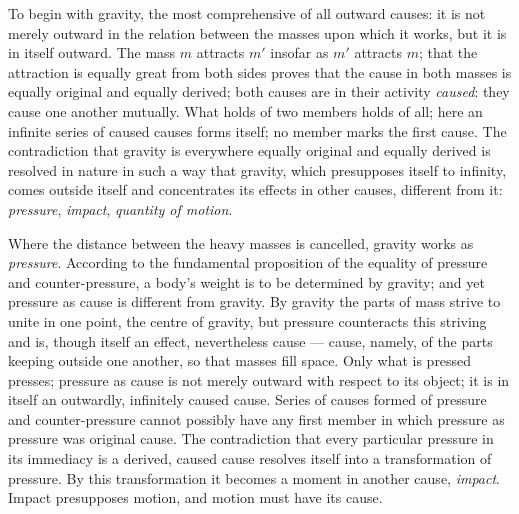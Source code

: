 \documentclass[12pt,a4paper]{book}
\begin{document}
To begin with gravity, the most comprehensive of all outward causes: it is not merely outward in the
relation between the masses upon which it works, but it is in itself outward. The mass $m$ attracts
$m'$ insofar as $m'$ attracts $m$; that the attraction is equally great from both sides proves that
the cause in both masses is equally original and equally derived; both causes are in their activity
\emph{caused}: they cause one another mutually. What holds of two members holds of all; here an
infinite series of caused causes forms itself; no member marks the first cause. The contradiction that
gravity is everywhere equally original and equally derived is resolved in nature in such a way that
gravity, which presupposes itself to infinity, comes outside itself and concentrates its effects in
other causes, different from it: \emph{pressure}, \emph{impact}, \emph{quantity of motion}.

Where the distance between the heavy masses is cancelled, gravity works as \emph{pressure}. According
to the fundamental proposition of the equality of pressure and counter-pressure, a body's weight is to
be determined by gravity; and yet pressure as cause is different from gravity. By gravity the parts of
mass strive to unite in one point, the centre of gravity, but pressure counteracts this striving and
is, though itself an effect, nevertheless cause --- cause, namely, of the parts keeping outside one
another, so that masses fill space. Only what is pressed presses; pressure as cause is not merely
outward with respect to its object; it is in itself an outwardly, infinitely caused cause. Series of
causes formed of pressure and counter-pressure cannot possibly have any first member in which pressure
as pressure was original cause. The contradiction that every particular pressure in its immediacy is a
derived, caused cause resolves itself into a transformation of pressure. By this transformation it
becomes a moment in
another cause, \emph{impact}. Impact presupposes motion, and motion must have its cause.
\end{document}
